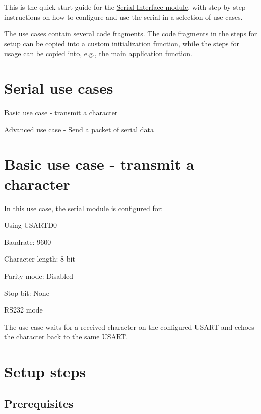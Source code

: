 This is the quick start guide for the \hyperlink{group__serial__group}{Serial Interface module}, with step-\/by-\/step instructions on how to configure and use the serial in a selection of use cases.

The use cases contain several code fragments. The code fragments in the steps for setup can be copied into a custom initialization function, while the steps for usage can be copied into, e.\+g., the main application function.\hypertarget{serial_quickstart_serial_use_cases}{}\section{Serial use cases}\label{serial_quickstart_serial_use_cases}

\begin{DoxyItemize}
\item \hyperlink{serial_quickstart_serial_basic_use_case}{Basic use case -\/ transmit a character}
\item \hyperlink{serial_use_case_1}{Advanced use case -\/ Send a packet of serial data}
\end{DoxyItemize}\hypertarget{serial_quickstart_serial_basic_use_case}{}\section{Basic use case -\/ transmit a character}\label{serial_quickstart_serial_basic_use_case}
In this use case, the serial module is configured for\+:
\begin{DoxyItemize}
\item Using U\+S\+A\+R\+T\+D0
\item Baudrate\+: 9600
\item Character length\+: 8 bit
\item Parity mode\+: Disabled
\item Stop bit\+: None
\item R\+S232 mode
\end{DoxyItemize}

The use case waits for a received character on the configured U\+S\+A\+R\+T and echoes the character back to the same U\+S\+A\+R\+T.\hypertarget{serial_quickstart_serial_basic_use_case_setup}{}\section{Setup steps}\label{serial_quickstart_serial_basic_use_case_setup}
\hypertarget{serial_quickstart_serial_basic_use_case_setup_prereq}{}\subsection{Prerequisites}\label{serial_quickstart_serial_basic_use_case_setup_prereq}

